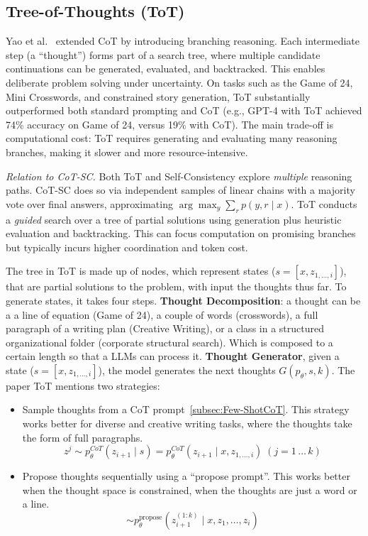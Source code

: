 \subsection{Tree-of-Thoughts (ToT)}
Yao et al.~\cite{treeofthought} extended CoT by introducing branching reasoning. Each intermediate step (a ``thought'') forms part of a search tree, where multiple candidate continuations can be generated, evaluated, and backtracked. This enables deliberate problem solving under uncertainty. On tasks such as the Game of 24, Mini Crosswords, and constrained story generation, ToT substantially outperformed both standard prompting and CoT (e.g., \gls{GPT}-4 with ToT achieved 74\% accuracy on Game of 24, versus 19\% with CoT). The main trade-off is computational cost: ToT requires generating and evaluating many reasoning branches, making it slower and more resource-intensive.

\textit{Relation to CoT-SC.} Both ToT and Self-Consistency explore \emph{multiple} reasoning paths. CoT-SC does so via independent samples of linear chains with a majority vote over final answers, approximating $\arg\max_y \sum_r p(y,r\mid x)$. ToT conducts a \emph{guided} search over a tree of partial solutions using generation plus heuristic evaluation and backtracking. This can focus computation on promising branches but typically incurs higher coordination and token cost.

The tree in ToT is made up of nodes, which represent states ($s=[x, z_{1,\ldots,i}]$), that are partial solutions to the problem, with input the thoughts thus far. To generate states, it takes four steps. \textbf{Thought Decomposition}: a thought can be a a line of equation (Game of 24), a couple of words (crosswords),  a full paragraph of a writing plan (Creative Writing), or a class in a structured organizational folder (corporate structural search). Which is composed to a certain length so that a \glspl{LLM} can process it. \textbf{Thought Generator}, given a state ($s=[x, z_{1,\ldots,i}]$), the model generates the next thoughts $G(p_\theta,s,k)$. The paper ToT mentions two strategies:
\begin{itemize}
    \item Sample thoughts from a CoT prompt~\ref{subsec:Few-ShotCoT}. This strategy works better for diverse and creative writing tasks,  where the thoughts take the form of full paragraphs.
    \begin{equation}
        z^{j}  \sim p_\theta^{CoT}(z_{i+1}\mid s) = p_\theta^{CoT}(z_{i+1}\mid x, z_{1,\ldots,i})\; (j = 1\,\ldots\,k)
    \end{equation}
    \item  Propose thoughts sequentially using a ``propose prompt''. This works better when the thought space is constrained, when the thoughts are just a word or a line.
    \begin{equation}
    [z_{i+1}^{(1)}, \dots, z_{i+1}^{(k)}] \sim p_\theta^{\text{propose}}(z_{i+1}^{(1:k)} \mid x, z_1, \dots, z_i)
    \end{equation}
\end{itemize}

